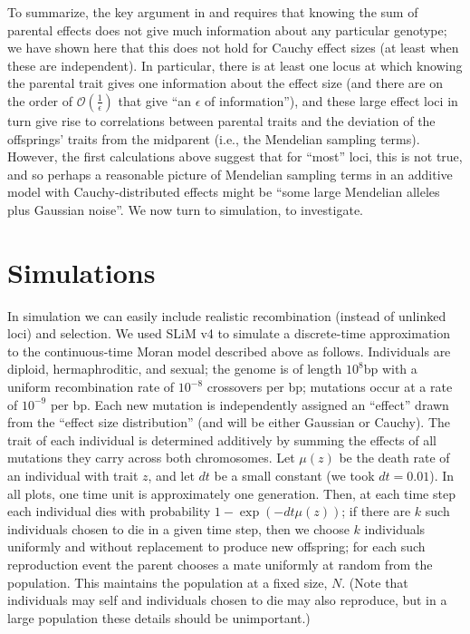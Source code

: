 \documentclass{article}
\newcommand{\1}{\mathbbm{1}}
\newcommand{\Oh}{{\mathcal O}}
\theoremstyle{remark}
\theoremstyle{definition}
\begin{document}
To summarize, the key argument in \citet{fisher1918correlation} and \citet{barton2017infinitesimal}  
requires that knowing the sum of parental effects does not give much information 
about any particular genotype;
we have shown here that this does not hold for Cauchy effect sizes
(at least when these are independent).
In particular, there is at least one locus at which knowing the parental trait gives one information about the effect size (and there are on the order of $\Oh\left(\frac{1}{\epsilon}\right)$ that give ``an $\epsilon$ of information''), and these large effect loci in turn give rise to correlations between
parental traits and the deviation of the offsprings' traits from the midparent
(i.e., the Mendelian sampling terms).
However, the first calculations above
suggest that for ``most'' loci,
this is not true,
and so perhaps a reasonable picture of Mendelian sampling terms
in an additive model with Cauchy-distributed effects
might be ``some large Mendelian alleles plus Gaussian noise''.
We now turn to simulation,
to investigate.

\section{Simulations}
    \label{sec:simulation}

In simulation we can easily include realistic recombination (instead of unlinked loci) and selection.
We used SLiM v4 \citep{haller2022slim4}
to simulate a discrete-time approximation to the continuous-time Moran model described above
as follows.
Individuals are diploid, hermaphroditic, and sexual;
the genome is of length $10^8$bp with a uniform recombination rate of $10^{-8}$ crossovers per bp;
mutations occur at a rate of $10^{-9}$ per bp. 
Each new mutation is independently assigned an ``effect''
drawn from the ``effect size distribution'' (and will be either Gaussian or Cauchy).
The trait of each individual is determined additively
by summing the effects of all mutations they carry across both chromosomes.
Let $\mu(z)$ be the death rate of an individual with trait $z$,
and let $dt$ be a small constant (we took $dt=0.01$).
In all plots, one time unit is approximately one generation.
Then, at each time step
each individual dies with probability $1 - \exp(-dt \mu(z))$;
if there are $k$ such individuals chosen to die in a given time step,
then we choose $k$ individuals uniformly and without replacement
to produce new offspring;
for each such reproduction event the parent chooses a mate uniformly at random from the population.
This maintains the population at a fixed size, $N$.
(Note that individuals may self and individuals chosen to die may also reproduce,
but in a large population these details should be unimportant.)
\end{document}
